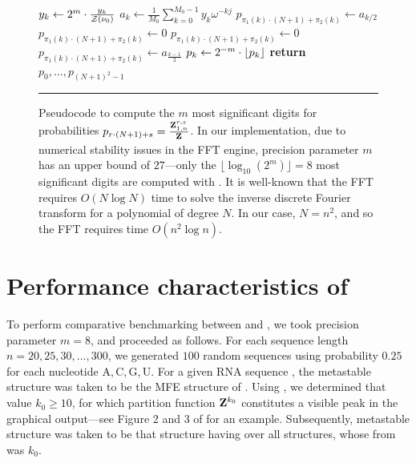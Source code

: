 \begin{figure}[!ht]
\begin{algorithmic}[1]
\State $y_k \gets 2^m \cdot \frac{y_k}{{\mathcal Z}_{}(\nu_0)}$
\EndFor
{}
\State $a_k \gets \frac{1}{M_0} \sum_{k=0}^{M_0-1} y_k \omega^{-kj}$
\EndFor
{}
\State $p_{\pi_1(k) \cdot (N+1) + \pi_2(k)} \gets a_{k/2}$
\Else
\State $p_{\pi_1(k) \cdot (N+1) + \pi_2(k)} \gets 0$
\EndIf
\Else
{}
\State $p_{\pi_1(k) \cdot (N+1) + \pi_2(k)} \gets 0$
\Else
\State $p_{\pi_1(k) \cdot (N+1) + \pi_2(k)} \gets a_{\frac{k-1}{2}}$
\EndIf
\EndIf
\EndFor
{}
\State $p_k \gets 2^{-m} \cdot \lfloor p_k \rfloor$
\EndFor
\State \textbf{return} $p_0,\dots,p_{(N + 1)^2 - 1}$
\EndFunction
\rule[-0.35ex]{0pt}{0pt}
\end{algorithmic}
\caption[Pseudocode for improved \ffttwo]{
Pseudocode to compute the $m$ most significant digits
for probabilities
$p_{r\cdot(N + 1)+s} = \frac{{\bf Z}^{r,s}_{1,n}}{{\bf Z}^{}_{}}$. In our implementation,
due to numerical stability issues in the FFT engine, precision parameter
$m$ has an upper bound of $27$---only the $\lfloor \log_{10}(2^m) \rfloor =8$ most significant digits
are computed with \ffttwo. It is well-known that
the FFT requires $O(N \log N)$ time to solve the inverse discrete
Fourier transform for a polynomial of degree $N$. In our case,
$N=n^2$, and so the FFT requires time $O(n^2 \log n)$.
}
\label{fig:ffttwo:algoImproved}
\rule[0ex]{0pt}{1.5em} \hrule
\end{figure}

\section{Performance characteristics of \ffttwo}
\label{sec:ffttwo:speed}

To perform comparative benchmarking between \rnatwofold and \ffttwo,
we took precision parameter $m=8$, and proceeded as follows.
For each sequence length $n = 20,25,30,\ldots,300$, we generated
$100$ random sequences using probability $0.25$ for each nucleotide
A,\,C,\,G,\,U.
For a given RNA sequence \seq, the metastable structure \strA was
taken to be the MFE structure of \seq.
Using \rnabor, we determined that value $k_0 \geq 10$, for which
partition function ${\bf Z}^{k_0}_{}$ constitutes a visible peak in the graphical
output---see Figure 2 and 3 of \citep{freyhult.b07} for an example.
Subsequently, metastable structure \strB was taken to be that structure
having \mfe over all structures, whose \bpd from
\strA was $k_0$.


